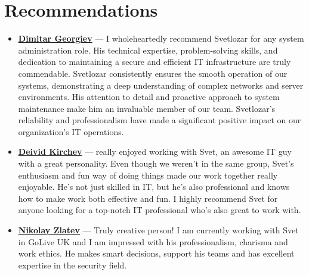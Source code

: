 \documentclass[letterpaper,10pt]{article}
\begin{document}
		\section*{Recommendations}
		\begin{itemize}
		 \item \textbf{\href{https://www.linkedin.com/in/dimitar-georgiev-29a6ab144/}{Dimitar Georgiev}} — I wholeheartedly recommend
			Svetlozar for any system administration role. His technical expertise, problem-solving skills, and dedication to
			maintaining a secure and efficient IT infrastructure are
			truly commendable. Svetlozar consistently ensures the
			smooth operation of our systems, demonstrating a deep
			understanding of complex networks and server environments. His attention to detail and proactive approach to
			system maintenance make him an invaluable member of
			our team. Svetlozar’s reliability and professionalism have
			made a significant positive impact on our organization’s
			IT operations.\\
			 \item \textbf{\href{https://www.linkedin.com/in/deivid-kirchev-00378b252/}{Deivid Kirchev}} —  really enjoyed working with Svet,
			an awesome IT guy with a great personality. Even though
			we weren’t in the same group, Svet’s enthusiasm and fun
			way of doing things made our work together really enjoyable. He’s not just skilled in IT, but he’s also professional
			and knows how to make work both effective and fun. I
			highly recommend Svet for anyone looking for a top-notch
			IT professional who’s also great to work with.\\
			 \item \textbf{\href{https://www.linkedin.com/in/nikolay-zlatev/}{Nikolay Zlatev}} — Truly creative person! I am currently
			working with Svet in GoLive UK and I am impressed with
			his professionalism, charisma and work ethics. He makes
			smart decisions, support his teams and has excellent expertise in the security field.
				\end{itemize}
\end{document}
